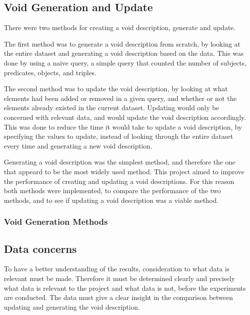 \subsection{Void Generation and Update}\label{sec:void}
There were two methods for creating a \gls{void} description, generate and update.

The first method was to generate a \gls{void} description from scratch, by looking at the entire dataset and generating a \gls{void} description based on the data. This was done by using a naive query, a simple query that counted the number of subjects, predicates, objects, and triples.

The second method was to update the \gls{void} description, by looking at what elements had been added or removed in a given query, and whether or not the elements already existed in the current dataset. Updating would only be concerned with relevant data, and would update the \gls{void} description accordingly. This was done to reduce the time it would take to update a \gls{void} description, by specifying the values to update, instead of looking through the entire dataset every time and generating a new \gls{void} description.

Generating a \gls{void} description was the simplest method, and therefore the one that appeard to be the most widely used method. This project aimed to improve the performance of creating and updating a \gls{void} descriptions. For this reason both methods were implemented, to compare the performance of the two methods, and to see if updating a \gls{void} description was a viable method.
\subsubsection{Void Generation Methods}\label{sec:voidmethods}


\subsection{Data concerns}\label{sec:concerns}
To have a better understanding of the results, consideration to what data is relevant must be made. Therefore it must be determined clearly and precisely what data is relevant to the project and what data is not, before the experiments are conducted. The data must give a clear insight in the comparison between updating and generating the \gls{void} description.

